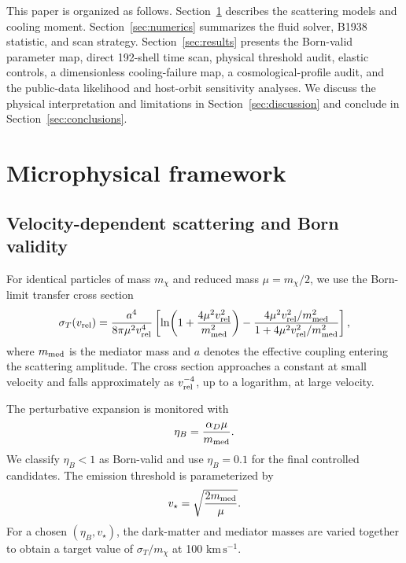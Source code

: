 \documentclass[12pt]{article}
\newcommand{\sigmavm}{\sigma_T/m_\chi}
\newcommand{\vrel}{v_{\rm rel}}
\newcommand{\vstar}{v_\star}
\begin{document}
This paper is organized as follows.  Section~\ref{sec:microphysics} describes
the scattering models and cooling moment.  Section~\ref{sec:numerics}
summarizes the fluid solver, B1938 statistic, and scan strategy.
Section~\ref{sec:results} presents the Born-valid parameter map, direct
192-shell time scan, physical threshold audit, elastic controls, a
dimensionless cooling-failure map, a cosmological-profile audit, and the
public-data likelihood and host-orbit sensitivity analyses.  We discuss the
physical interpretation and limitations in
Section~\ref{sec:discussion} and conclude in Section~\ref{sec:conclusions}.

\section{Microphysical framework}
\label{sec:microphysics}

\subsection{Velocity-dependent scattering and Born validity}

For identical particles of mass $m_\chi$ and reduced mass
$\mu=m_\chi/2$, we use the Born-limit transfer cross section
\begin{equation}
  \sigma_T(\vrel)=\frac{a^4}{8\pi\mu^2\vrel^4}
  \left[
  \ln\!\left(1+\frac{4\mu^2\vrel^2}{m_{\rm med}^2}\right)
  -\frac{4\mu^2\vrel^2/m_{\rm med}^2}
  {1+4\mu^2\vrel^2/m_{\rm med}^2}
  \right],
  \label{eq:sigma-transfer}
\end{equation}
where $m_{\rm med}$ is the mediator mass and $a$ denotes the effective
coupling entering the scattering amplitude.  The cross section approaches a
constant at small velocity and falls approximately as $\vrel^{-4}$, up to a
logarithm, at large velocity.

The perturbative expansion is monitored with
\begin{equation}
  \eta_B=\frac{\alpha_D\mu}{m_{\rm med}}.
  \label{eq:born-parameter}
\end{equation}
We classify $\eta_B<1$ as Born-valid and use $\eta_B=0.1$ for the final
controlled candidates.  The emission threshold is parameterized by
\begin{equation}
  \vstar=\sqrt{\frac{2m_{\rm med}}{\mu}}.
  \label{eq:threshold}
\end{equation}
For a chosen $(\eta_B,\vstar)$, the dark-matter and mediator masses are varied
together to obtain a target value of $\sigmavm$ at 100 $\mathrm{km\,s^{-1}}$.
\end{document}
